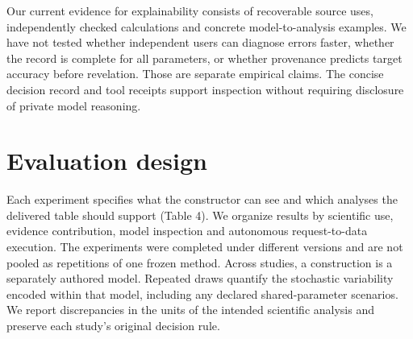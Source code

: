 \documentclass[11pt,letterpaper]{article}
\begin{document}
Our current evidence for explainability consists of recoverable source uses, independently checked calculations and concrete model-to-analysis examples. We have not tested whether independent users can diagnose errors faster, whether the record is complete for all parameters, or whether provenance predicts target accuracy before revelation. Those are separate empirical claims. The concise decision record and tool receipts support inspection without requiring disclosure of private model reasoning.


\section{Evaluation design}

Each experiment specifies what the constructor can see and which analyses the delivered table should support (Table 4). We organize results by scientific use, evidence contribution, model inspection and autonomous request-to-data execution. The experiments were completed under different versions and are not pooled as repetitions of one frozen method. Across studies, a construction is a separately authored model. Repeated draws quantify the stochastic variability encoded within that model, including any declared shared-parameter scenarios. We report discrepancies in the units of the intended scientific analysis and preserve each study's original decision rule.


\FloatBarrier

\begingroup

\small

\renewcommand{\arraystretch}{1.22}
\end{document}
